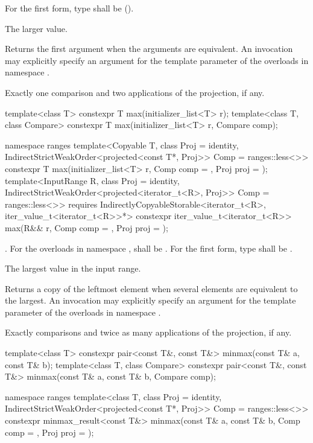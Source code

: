 \begin{itemdescr}
\pnum
\requires
For the first form, type  shall be
 ().

\pnum
\returns
The larger value.

\pnum
\remarks
Returns the first argument when the arguments are equivalent.
An invocation may explicitly specify
an argument for the template parameter 
of the overloads in namespace .

\pnum
\complexity
Exactly one comparison and two applications of the projection, if any.
\end{itemdescr}

%
\begin{itemdecl}
template<class T>
  constexpr T max(initializer_list<T> r);
template<class T, class Compare>
  constexpr T max(initializer_list<T> r, Compare comp);

namespace ranges {
  template<Copyable T, class Proj = identity,
           IndirectStrictWeakOrder<projected<const T*, Proj>> Comp = ranges::less<>>
    constexpr T max(initializer_list<T> r, Comp comp = {}, Proj proj = {});
  template<InputRange R, class Proj = identity,
           IndirectStrictWeakOrder<projected<iterator_t<R>, Proj>> Comp = ranges::less<>>
    requires IndirectlyCopyableStorable<iterator_t<R>, iter_value_t<iterator_t<R>>*>
    constexpr iter_value_t<iterator_t<R>>
      max(R&& r, Comp comp = {}, Proj proj = {});
}
\end{itemdecl}

\begin{itemdescr}
\pnum
\requires
{}.
For the overloads in namespace ,
 shall be .
For the first form, type  shall be .

\pnum
\returns
The largest value in the input range.

\pnum
\remarks
Returns a copy of the leftmost element
when several elements are equivalent to the largest.
An invocation may explicitly specify
an argument for the template parameter 
of the overloads in namespace .

\pnum
\complexity
Exactly  comparisons
and twice as many applications of the projection, if any.
\end{itemdescr}

%
\begin{itemdecl}
template<class T>
  constexpr pair<const T&, const T&> minmax(const T& a, const T& b);
template<class T, class Compare>
  constexpr pair<const T&, const T&> minmax(const T& a, const T& b, Compare comp);

namespace ranges {
  template<class T, class Proj = identity,
           IndirectStrictWeakOrder<projected<const T*, Proj>> Comp = ranges::less<>>
    constexpr minmax_result<const T&>
      minmax(const T& a, const T& b, Comp comp = {}, Proj proj = {});
}
\end{itemdecl}


